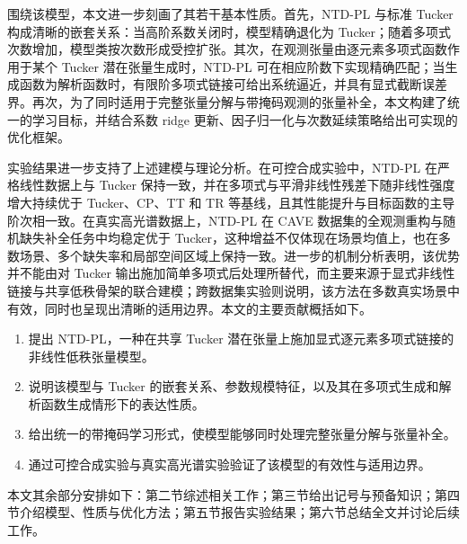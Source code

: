 围绕该模型，本文进一步刻画了其若干基本性质。首先，NTD-PL 与标准 Tucker 构成清晰的嵌套关系：当高阶系数关闭时，模型精确退化为 Tucker；随着多项式次数增加，模型类按次数形成受控扩张。其次，在观测张量由逐元素多项式函数作用于某个 Tucker 潜在张量生成时，NTD-PL 可在相应阶数下实现精确匹配；当生成函数为解析函数时，有限阶多项式链接可给出系统逼近，并具有显式截断误差界。再次，为了同时适用于完整张量分解与带掩码观测的张量补全，本文构建了统一的学习目标，并结合系数 ridge 更新、因子归一化与次数延续策略给出可实现的优化框架。

实验结果进一步支持了上述建模与理论分析。在可控合成实验中，NTD-PL 在严格线性数据上与 Tucker 保持一致，并在多项式与平滑非线性残差下随非线性强度增大持续优于 Tucker、CP、TT 和 TR 等基线，且其性能提升与目标函数的主导阶次相一致。在真实高光谱数据上，NTD-PL 在 CAVE 数据集的全观测重构与随机缺失补全任务中均稳定优于 Tucker，这种增益不仅体现在场景均值上，也在多数场景、多个缺失率和局部空间区域上保持一致。进一步的机制分析表明，该优势并不能由对 Tucker 输出施加简单多项式后处理所替代，而主要来源于显式非线性链接与共享低秩骨架的联合建模；跨数据集实验则说明，该方法在多数真实场景中有效，同时也呈现出清晰的适用边界。本文的主要贡献概括如下。

\begin{enumerate}
    \item 提出 NTD-PL，一种在共享 Tucker 潜在张量上施加显式逐元素多项式链接的非线性低秩张量模型。
    \item 说明该模型与 Tucker 的嵌套关系、参数规模特征，以及其在多项式生成和解析函数生成情形下的表达性质。
    \item 给出统一的带掩码学习形式，使模型能够同时处理完整张量分解与张量补全。
    \item 通过可控合成实验与真实高光谱实验验证了该模型的有效性与适用边界。
\end{enumerate}

本文其余部分安排如下：第二节综述相关工作；第三节给出记号与预备知识；第四节介绍模型、性质与优化方法；第五节报告实验结果；第六节总结全文并讨论后续工作。
